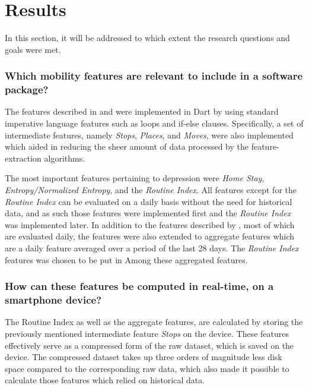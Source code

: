 \section{Results}

In this section, it will be addressed to which extent the research questions and goals were met.

\subsubsection*{Which mobility features are relevant to include in a software package?}
The features described in \cite{Saeb2015} and \cite{extraction-of-behavioural-features} were implemented in Dart by using standard imperative language features such as loops and if-else clauses. Specifically, a set of intermediate features, namely\textit{ Stops}, \textit{Places}, and \textit{Moves}, were also implemented which aided in reducing the sheer amount of data processed by the feature-extraction algorithms. 

The most important features pertaining to depression were \textit{Home Stay}, \textit{Entropy/Normalized Entropy}, and the \textit{Routine Index}. All features except for the \textit{Routine Index} can be evaluated on a daily basis without the need for historical data, and as such those features were implemented first and the \textit{Routine Index} was implemented later. In addition to the features described by \cite{Saeb2015}, most of which are evaluated daily, the features were also extended to aggregate features which are a daily feature averaged over a period of the last 28 days. The \textit{Routine Index} features was chosen to be put in Among these aggregated features.

\subsubsection*{How can these features be computed in real-time, on a smartphone device?}
The Routine Index as well as the aggregate features, are calculated by storing the previously mentioned intermediate feature \textit{Stops} on the device. These features effectively serve as a compressed form of the raw dataset, which is saved on the device. The compressed dataset takes up three orders of magnitude less disk space compared to the corresponding raw data, which also made it possible to calculate those features which relied on historical data.

